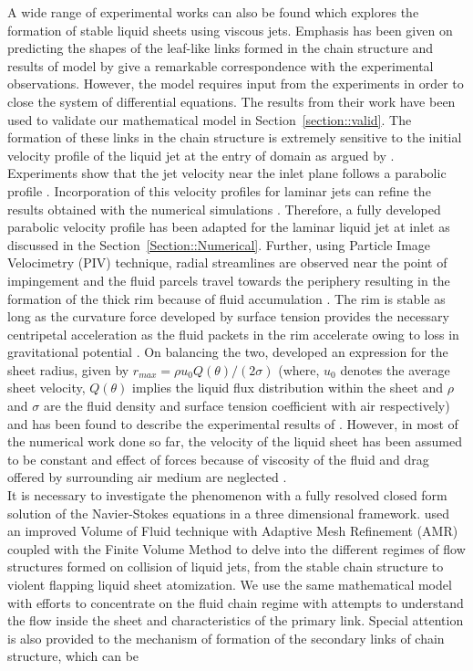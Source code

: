 \documentclass[%
aip,
sd,%
amsmath,amssymb,
preprint,%
author-year,%
]{revtex4-1}
\begin{document}
A wide range of experimental works can also be found which explores the formation of stable liquid sheets using viscous jets. Emphasis has been given on predicting the shapes of the leaf-like links formed in the chain structure and results of model by \cite{bush2004collision} give a remarkable correspondence with the experimental observations. However, the model requires input from the experiments in order to close the system of differential equations. The results from their work have been used to validate our mathematical model in Section~\ref{section::valid}. The formation of these links in the chain structure is extremely sensitive to the initial velocity profile of the liquid jet at the entry of domain as argued by \cite{choo2002velocity,choo2007effect,inamura2014effect}. Experiments show that the jet velocity near the inlet plane follows a parabolic profile \citep{choo2002velocity}. Incorporation of this velocity profiles for laminar jets can refine the results obtained  with the numerical simulations \citep{chen2013high}. Therefore, a fully developed parabolic velocity profile has been adapted for the laminar liquid jet at inlet as discussed in the Section~\ref{Section::Numerical}. Further, using Particle Image Velocimetry (PIV) technique, radial streamlines are observed near the point of impingement and the fluid parcels travel towards the periphery resulting in the formation of the thick rim because of fluid accumulation \citep{choo2002velocity,bush2004collision}. The rim is stable as long as the curvature force developed by surface tension provides the necessary centripetal acceleration as the fluid packets in the rim accelerate owing to loss in gravitational potential \citep{bremond2006atomization}. On balancing the two, \cite{taylor1960formation} developed an expression for the sheet radius, given by $r_{max} = \rho u_0 Q(\theta)/(2\sigma)$ (where, $u_0$ denotes the average sheet velocity, $Q(\theta)$ implies the liquid flux distribution within the sheet and $\rho$ and $\sigma$ are the fluid density and surface tension coefficient with air respectively) and has been found to describe the experimental results of \cite{bush2004collision}.  However, in most of the numerical work done so far, the velocity of the liquid sheet has been assumed to be constant and effect of forces because of viscosity of the fluid and drag offered by surrounding air medium are neglected \citep{taylor1960formation,hureau1998impinging,bush2004collision}.\\It is necessary to investigate the phenomenon with a fully resolved closed form solution of the Navier-Stokes equations in a three dimensional framework. \cite{chen2013high,ma2011atomization} used an improved Volume of Fluid technique with Adaptive Mesh Refinement (AMR) coupled with the Finite Volume Method to delve into the different regimes of flow structures formed on collision of liquid jets, from the stable chain structure to violent flapping liquid sheet atomization. We use the same mathematical model with efforts to concentrate on the fluid chain regime with attempts to understand the flow inside the sheet and characteristics of the primary link. Special attention is also provided to the mechanism of formation of the secondary links of chain structure, which can be 
\end{document}
